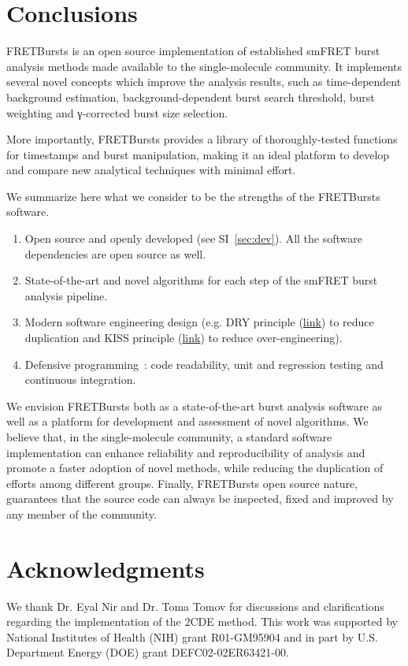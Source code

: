 \section{Conclusions}
\label{sec:conclusions}

FRETBursts is an open source implementation of established smFRET burst analysis methods
made available to the single-molecule community.
It implements several novel concepts which improve the analysis results, such as
time-dependent background estimation, background-dependent burst search threshold,
burst weighting and γ-corrected burst size selection.

More importantly, FRETBursts provides a library of thoroughly-tested functions
for timestamps and burst manipulation, making it an ideal platform to
develop and compare new analytical techniques with minimal effort.

We summarize here what we consider to be the strengths
of the FRETBursts software.

\begin{enumerate}
\item Open source and openly developed (see SI~\ref{sec:dev}).
All the software dependencies are open source as well.
\item State-of-the-art and novel algorithms for each step of the
smFRET burst analysis pipeline.
\item Modern software engineering design (e.g. DRY principle
(\href{http://en.wikipedia.org/wiki/Don\%27t_repeat_yourself}{link})
to reduce duplication and KISS principle
(\href{http://en.wikipedia.org/wiki/KISS_principle}{link})
to reduce over-engineering).
\item Defensive programming~\cite{Prli__2012}: code readability,
unit and regression testing and continuous integration.
\end{enumerate}

We envision FRETBursts both as a state-of-the-art burst analysis
software as well as a platform for development and assessment of novel algorithms.
We believe that, in the single-molecule community,
a standard software implementation can enhance
reliability and reproducibility of analysis and promote a faster adoption of novel methods, 
while reducing the duplication of efforts among different groups.
Finally, FRETBursts open source nature, guarantees that the source code
can always be inspected, fixed and improved by any member of the community.

\section*{Acknowledgments}
We thank Dr. Eyal Nir and Dr. Toma Tomov for discussions and clarifications regarding the 
implementation of the 2CDE method.
This work was supported by National Institutes of Health (NIH)
grant R01-GM95904 and in part by U.S. Department Energy (DOE) grant DEFC02-02ER63421-00.
